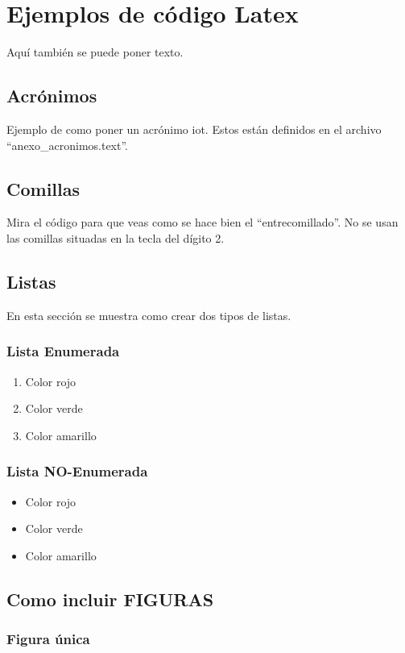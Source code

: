 \chapter{Ejemplos de código Latex}
\label{ch:codigos_ejemplo}
Aquí también se puede poner texto.

\section{Acrónimos}
Ejemplo de como poner un acrónimo \acrshort{iot}. Estos están definidos en el archivo ``anexo\_acronimos.text''.


\section{Comillas}
Mira el código para que veas como se hace bien el ``entrecomillado''. No se usan las comillas situadas en la tecla del dígito 2.

\section{Listas}
En esta sección se muestra como crear dos tipos de listas.

\subsection{Lista Enumerada}
\begin{enumerate}
\item Color rojo
\item Color verde
\item Color amarillo
\end{enumerate}



\subsection{Lista NO-Enumerada}
\begin{itemize}
\item Color rojo
\item Color verde
\item Color amarillo
\end{itemize}

\section{Como incluir FIGURAS}

\subsection{Figura única}
\label{sec:figura_unica}

